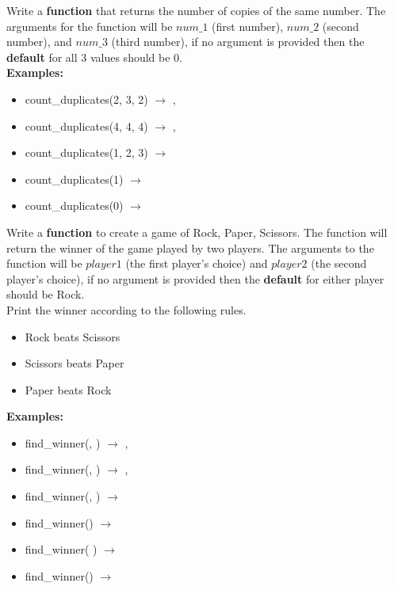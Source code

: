 	\item 
		Write a \textbf{function} that returns the number of copies of the same number. 
		The arguments for the function will be $num\_1$ (first number), $num\_2$ (second number), 
		and $num\_3$ (third number), if no argument is provided then the \textbf{default} for all 
		3 values should be 0.\\

		\textbf{Examples:}		
		\begin{itemize}
			\item  count\_duplicates(2, 3, 2) $\rightarrow$ , 
			\item  count\_duplicates(4, 4, 4) $\rightarrow$ , 
			\item  count\_duplicates(1, 2, 3) $\rightarrow$  
			\item  count\_duplicates(1) $\rightarrow$  
			\item  count\_duplicates(0) $\rightarrow$  
		\end{itemize}


	\item 
		Write a \textbf{function} to create a game of Rock, Paper, Scissors. The function will 
		return the winner of the game played by two players.
		The arguments to the function will be $player1$ (the first player's choice) and $player2$ 
		(the second player's choice), if no argument is provided then the \textbf{default} for 
		either player should be Rock.\\
		Print the winner according to the following rules. 
		\begin{itemize}
			\item Rock beats Scissors
			\item Scissors beats Paper
			\item Paper beats Rock
		\end{itemize}		
		\textbf{Examples:}		
		\begin{itemize}
			\item  find\_winner(, ) $\rightarrow$ , 
			\item  find\_winner(, ) $\rightarrow$ , 
			\item  find\_winner(\csq{Rock}, ) $\rightarrow$ 
			\item  find\_winner() $\rightarrow$ 
			\item  find\_winner( ) $\rightarrow$ 
			\item  find\_winner() $\rightarrow$ 
		\end{itemize}


